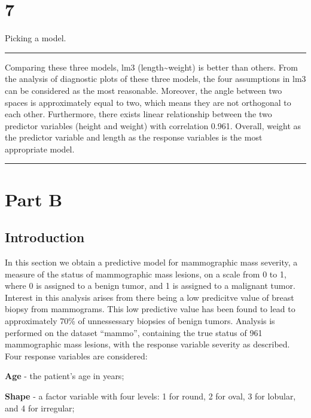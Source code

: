 \documentclass[]{article}
\begin{document}
\section{7}\label{section-5}

Picking a model.

\begin{center}\rule{0.5\linewidth}{\linethickness}\end{center}

Comparing these three models, lm3 (length\textasciitilde{}weight) is
better than others. From the analysis of diagnostic plots of these three
models, the four assumptions in lm3 can be considered as the most
reasonable. Moreover, the angle between two spaces is approximately
equal to two, which means they are not orthogonal to each other.
Furthermore, there exists linear relationship between the two predictor
variables (height and weight) with correlation 0.961. Overall, weight as
the predictor variable and length as the response variables is the most
appropriate model.

\begin{center}\rule{0.5\linewidth}{\linethickness}\end{center}

\section{Part B}\label{part-b}

\subsection{Introduction}\label{introduction}

In this section we obtain a predictive model for mammographic mass
severity, a measure of the status of mammographic mass lesions, on a
scale from 0 to 1, where 0 is assigned to a benign tumor, and 1 is
assigned to a malignant tumor. Interest in this analysis arises from
there being a low predicitve value of breast biopsy from mammograms.
This low predictive value has been found to lead to approximately 70\%
of unnessessary biopsies of benign tumors. Analysis is performed on the
dataset ``mammo'', containing the true status of 961 mammographic mass
lesions, with the response variable severity as described. Four response
variables are considered:

\textbf{Age} - the patient's age in years;

\textbf{Shape} - a factor variable with four levels: 1 for round, 2 for
oval, 3 for lobular, and 4 for irregular;
\end{document}
